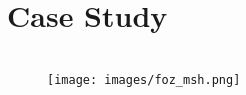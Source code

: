 \section{Case Study}

\begin{frame}[plain]
	\frametitle{\polu}
	\begin{figure}
		\centering
		\begin{columns}
			\texttt{[image: images/foz\_msh.png]}
			\pause
			\vfill
			\vfill
		\end{columns}
	\end{figure}
\end{frame}